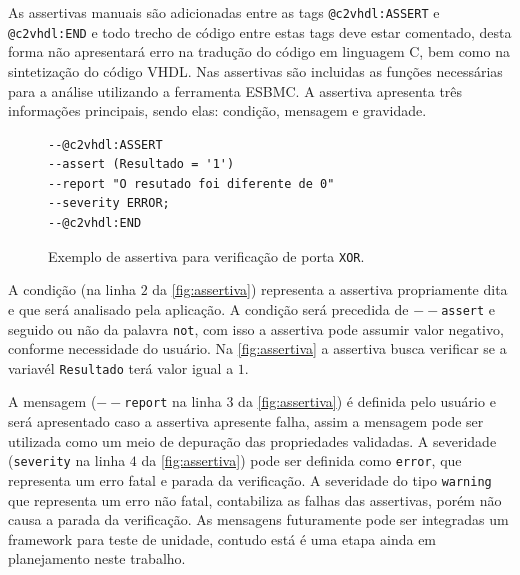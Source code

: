 \par
\label{sec:assertiva_descricao} As assertivas manuais são adicionadas entre as tags \texttt{@c2vhdl:ASSERT} e \texttt{@c2vhdl:END} e todo trecho de código entre estas tags deve estar comentado, desta forma não apresentará erro na tradução do código em linguagem C, bem como na sintetização do código VHDL. Nas assertivas são incluidas as funções necessárias para a análise utilizando a ferramenta ESBMC. A assertiva apresenta três informações principais, sendo elas: condição, mensagem e gravidade.



\begin{figure}[H]
\caption{\label{fig:assertiva} Exemplo de assertiva para verificação de porta \texttt{XOR}.}
	\begin{center}
    \begin{minipage}{0.99\textwidth}
    \begin{lstlisting}       
--@c2vhdl:ASSERT
--assert (Resultado = '1')
--report "O resutado foi diferente de 0"
--severity ERROR;
--@c2vhdl:END
    \end{lstlisting}
    \end{minipage}
	\end{center}
\end{figure}


\par
A condição (na linha $2$ da \autoref{fig:assertiva}) representa a assertiva propriamente dita e que será analisado pela aplicação. A condição será precedida de \texttt{$--$assert} e seguido ou não da palavra \texttt{not}, com isso a assertiva pode assumir valor negativo, conforme necessidade do usuário. Na \autoref{fig:assertiva} a assertiva busca verificar se a variavél \texttt{Resultado} terá valor igual a $1$. 

\par
A mensagem (\texttt{$--$report} na linha $3$ da \autoref{fig:assertiva}) é definida pelo usuário e será apresentado caso a assertiva apresente falha, assim a mensagem pode ser utilizada como um meio de depuração das propriedades validadas. A severidade (\texttt{severity} na linha $4$ da \autoref{fig:assertiva}) pode ser definida como \texttt{error}, que representa um erro fatal e parada da verificação. A severidade do tipo \texttt{warning} que representa um erro não fatal, contabiliza as falhas das assertivas, porém não causa a parada da verificação.
% 
As mensagens futuramente pode ser integradas um framework para teste de unidade, contudo está é uma etapa ainda em planejamento neste trabalho.

